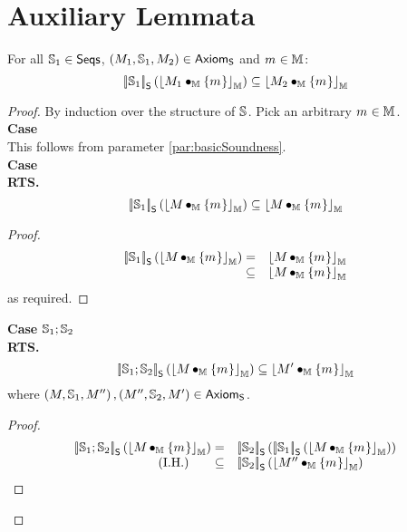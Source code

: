\section*{Auxiliary Lemmata}
\begin{lemma}\label{lem:seqSoundness}
For all $\mathbb{S}_{1} \in \textsf{Seqs}$, $\left(M_{1}, \mathbb{S}_{1}, M_{2}\right) \in \textsf{Axiom}_{\textsf{S}}$ and $m_{} \in \mathbb{M}$:
%
\[
	\left[\!\left| \mathbb{S}_{1} \right |\! \right]_{\textsf{S}}\left( \left\lfloor M_{1} \bullet_{\mathbb{M}} \{m_{}\} \right\rfloor_{\mathbb{M}} \right) \subseteq \left\lfloor M_{2} \bullet_{\mathbb{M}} \{m_{}\} \right\rfloor_{\mathbb{M}}
\]
%
\begin{proof}
By induction over the structure of $\mathbb{S}_{}$. Pick an arbitrary $m_{} \in \mathbb{M}$.\\

\noindent\textbf{Case \hspace*{0.3cm}}\bc{}\\
This follows from parameter \ref{par:basicSoundness}.\\


\noindent\textbf{Case \hspace*{0.3cm}\skipC}\\
\textbf{RTS.}
%
\[
	\left[\!\left| \mathbb{S}_{1} \right |\! \right]_{\textsf{S}}\left( \left\lfloor M_{} \bullet_{\mathbb{M}} \{m_{}\} \right\rfloor_{\mathbb{M}} \right) 
	\subseteq \left\lfloor M_{} \bullet_{\mathbb{M}} \{m_{}\} \right\rfloor_{\mathbb{M}}
\]
%
\begin{proof}
%
\[
\begin{array}{r l}
	\left[\!\left| \mathbb{S}_{1} \right |\! \right]_{\textsf{S}}\left( \left\lfloor M_{} \bullet_{\mathbb{M}} \{m_{}\} \right\rfloor_{\mathbb{M}} \right) 
	= &
	\left\lfloor M_{} \bullet_{\mathbb{M}} \{m_{}\} \right\rfloor_{\mathbb{M}}\\

	\subseteq & \left\lfloor M_{} \bullet_{\mathbb{M}} \{m_{}\} \right\rfloor_{\mathbb{M}}
\end{array}
\]
%
as required.
\renewcommand{\qed}{}
\end{proof}
%
%

\noindent\textbf{Case \hspace*{0.3cm}}$\mathbb{S}_{1} ; \mathbb{S}_{2}$\\
\textbf{RTS.}
%
\[
	\left[\!\left| \mathbb{S}_{1}; \mathbb{S}_{2} \right |\! \right]_{\textsf{S}}\left( \left\lfloor M_{} \bullet_{\mathbb{M}} \{m_{}\} \right\rfloor_{\mathbb{M}} \right) 
	\subseteq \left\lfloor M_{}' \bullet_{\mathbb{M}} \{m_{}\} \right\rfloor_{\mathbb{M}}
\]
%
where $\left(M_{}, \mathbb{S}_{1}, M_{}'' \right), \left(M_{}'', \mathbb{S}_{2}, M_{}' \right)  \in \textsf{Axiom}_{\textsf{S}}$.
\begin{proof}
%
\[
\begin{array}{r l}
	
	\opSemSeq{\seq{1}; \seq{2}}{\reifyH{\Hp{} \composeH \{\h{}\}}} 
	= &  
	\opSemSeq{\seq{2}}{ \opSemSeq{\seq{1}}{\reifyH{\Hp{} \composeH \{\h{}\}}}}\\

	\text{(I.H.) \hspace*{0.5cm}}
	\subseteq &
	\opSemSeq{\seq{2}}{\reifyH{\Hp{}'' \composeH \{\h{}\}}}\\
	

\end{array}\]
\end{proof}
\end{proof}
\end{lemma}
